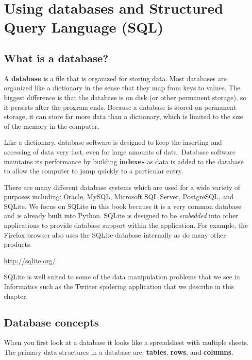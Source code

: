 \documentclass[10pt]{book}
\begin{document}
\chapter{Using databases and Structured Query Language (SQL)}

\section{What is a database?}

A {\bf database} is a file that is organized for storing data.
Most databases are organized like a dictionary in the sense
that they map from keys to values.  The biggest difference
is that the database is on disk (or other permanent storage),
so it persists after the program ends.  Because a database is
stored on permanent storage, it can store far more data than
a dictionary, which is limited to the size of the memory 
in the computer.

Like a dictionary, database software is designed to keep 
the inserting and accessing of data very fast, even for large
amounts of data.   Database software maintains its performance by 
building {\bf indexes} as data is added to the database
to allow the computer to jump quickly to a particular
entry.

There are many different database systems which are used for a wide
variety of purposes including: Oracle, MySQL, Microsoft SQL Server, 
PostgreSQL, and SQLite.  We focus on SQLite in this book because
it is a very common database and is already built into Python.  
SQLite is designed to be \emph{embedded} into other applications
to provide database support within the application.  For example,
the Firefox browser also uses the SQLite database internally as do 
many other products.

\url{http://sqlite.org/}

SQLite is well suited to some of the data manipulation problems that we 
see in Informatics such as the Twitter spidering application that we 
describe in this chapter.

\section{Database concepts}

When you first look at a database it looks like a 
spreadsheet with multiple sheets.   The primary data structures 
in a database are:
{\bf tables}, {\bf rows}, and {\bf columns}.  
\end{document}
